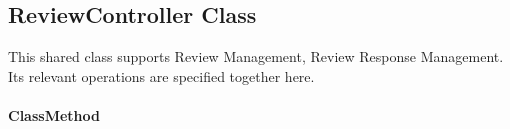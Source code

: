 
\subsection{ReviewController Class}
\label{cls:nhuy-ReviewController}

This shared class supports Review Management, Review Response Management. Its relevant operations are specified together here.

\paragraph{ClassMethod}
